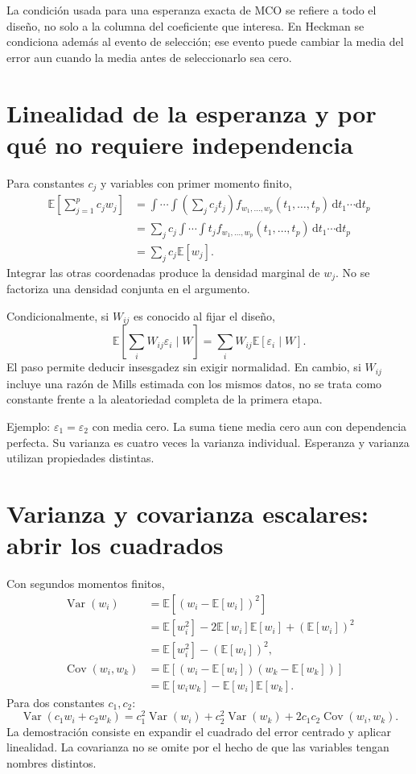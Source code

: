 \documentclass[11pt,a4paper]{article}
\newcommand{\E}{\mathbb E}
\DeclareMathOperator{\Var}{Var}
\DeclareMathOperator{\Cov}{Cov}
\begin{document}
La condición usada para una esperanza exacta de MCO se refiere a todo el diseño, no solo a la columna del coeficiente que interesa. En Heckman se condiciona además al evento de selección; ese evento puede cambiar la media del error aun cuando la media antes de seleccionarlo sea cero.

\clearpage
\section{Linealidad de la esperanza y por qué no requiere independencia}

Para constantes $c_j$ y variables con primer momento finito,
\[
\begin{aligned}
\E\left[\sum_{j=1}^{p}c_jw_j\right]
&=\int\cdots\int\left(\sum_jc_jt_j\right)
f_{w_1,\ldots,w_p}(t_1,\ldots,t_p)\,\mathrm dt_1\cdots\mathrm dt_p\\
&=\sum_jc_j\int\cdots\int t_j
f_{w_1,\ldots,w_p}(t_1,\ldots,t_p)\,\mathrm dt_1\cdots\mathrm dt_p\\
&=\sum_jc_j\E[w_j].
\end{aligned}
\]
Integrar las otras coordenadas produce la densidad marginal de $w_j$. No se factoriza una densidad conjunta en el argumento.

Condicionalmente, si $W_{ij}$ es conocido al fijar el diseño,
\[
\E\left[\sum_iW_{ij}\varepsilon_i\mid W\right]
=\sum_iW_{ij}\E[\varepsilon_i\mid W].
\]
El paso permite deducir insesgadez sin exigir normalidad. En cambio, si $W_{ij}$ incluye una razón de Mills estimada con los mismos datos, no se trata como constante frente a la aleatoriedad completa de la primera etapa.

Ejemplo: $\varepsilon_1=\varepsilon_2$ con media cero. La suma tiene media cero aun con dependencia perfecta. Su varianza es cuatro veces la varianza individual. Esperanza y varianza utilizan propiedades distintas.

\clearpage
\section{Varianza y covarianza escalares: abrir los cuadrados}

Con segundos momentos finitos,
\[
\begin{aligned}
\Var(w_i)&=\E[(w_i-\E[w_i])^2]\\
&=\E[w_i^2]-2\E[w_i]\E[w_i]+(\E[w_i])^2\\
&=\E[w_i^2]-(\E[w_i])^2,\\
\Cov(w_i,w_k)&=\E[(w_i-\E[w_i])(w_k-\E[w_k])]\\
&=\E[w_iw_k]-\E[w_i]\E[w_k].
\end{aligned}
\]
Para dos constantes $c_1,c_2$:
\[
\Var(c_1w_i+c_2w_k)
=c_1^2\Var(w_i)+c_2^2\Var(w_k)+2c_1c_2\Cov(w_i,w_k).
\]
La demostración consiste en expandir el cuadrado del error centrado y aplicar linealidad. La covarianza no se omite por el hecho de que las variables tengan nombres distintos.
\end{document}
